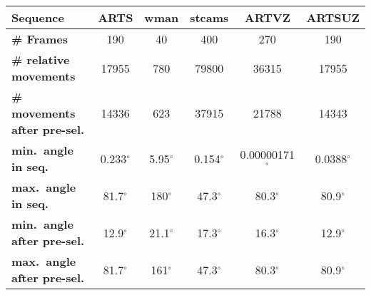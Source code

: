 %
%
\begin{tabular}{l|ccc|cc}
\hline
                  \textbf{Sequence} &          ARTS &           wman &         stcams &         ARTVZ &        ARTSUZ \\  \hline
                 \textbf{\# Frames} &             190 &              40 &             400 &             270 &             190 \\ 
     \textbf{\# relative movements} &           17955 &             780 &           79800 &           36315 &           17955 \\ 
\textbf{\# movements after pre-sel.} &           14336 &             623 &           37915 &           21788 &           14343 \\ 
       \textbf{min.\ angle in seq.} &   0.233$^\circ$ &    5.95$^\circ$ &   0.154$^\circ$ & 0.00000171$^\circ$ &  0.0388$^\circ$ \\ 
       \textbf{max.\ angle in seq.} &    81.7$^\circ$ &     180$^\circ$ &    47.3$^\circ$ &    80.3$^\circ$ &    80.9$^\circ$ \\ 
\textbf{min.\ angle after pre-sel.} &    12.9$^\circ$ &    21.1$^\circ$ &    17.3$^\circ$ &    16.3$^\circ$ &    12.9$^\circ$ \\ 
\textbf{max.\ angle after pre-sel.} &    81.7$^\circ$ &     161$^\circ$ &    47.3$^\circ$ &    80.3$^\circ$ &    80.9$^\circ$ \\ \hline
\end{tabular}
